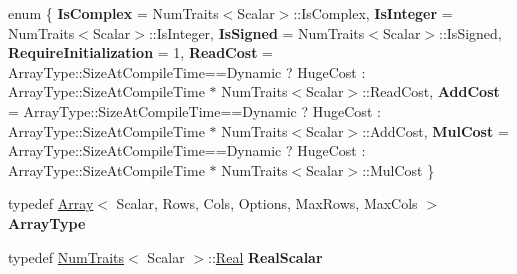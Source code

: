 \begin{DoxyCompactItemize}
\item 
\mbox{\label{struct_eigen_1_1_num_traits_3_01_array_3_01_scalar_00_01_rows_00_01_cols_00_01_options_00_01_max_rows_00_01_max_cols_01_4_01_4_aa0b8464e6397d3e48a977daf7680cbae}} 
enum \{ \newline
{\bfseries Is\+Complex} = Num\+Traits$<$Scalar$>$\+::Is\+Complex, 
{\bfseries Is\+Integer} = Num\+Traits$<$Scalar$>$\+::Is\+Integer, 
{\bfseries Is\+Signed} = Num\+Traits$<$Scalar$>$\+::Is\+Signed, 
{\bfseries Require\+Initialization} = 1, 
\newline
{\bfseries Read\+Cost} = Array\+Type\+::Size\+At\+Compile\+Time==Dynamic ? Huge\+Cost \+: Array\+Type\+::Size\+At\+Compile\+Time $\ast$ Num\+Traits$<$Scalar$>$\+::Read\+Cost, 
{\bfseries Add\+Cost} = Array\+Type\+::Size\+At\+Compile\+Time==Dynamic ? Huge\+Cost \+: Array\+Type\+::Size\+At\+Compile\+Time $\ast$ Num\+Traits$<$Scalar$>$\+::Add\+Cost, 
{\bfseries Mul\+Cost} = Array\+Type\+::Size\+At\+Compile\+Time==Dynamic ? Huge\+Cost \+: Array\+Type\+::Size\+At\+Compile\+Time $\ast$ Num\+Traits$<$Scalar$>$\+::Mul\+Cost
 \}
\item 
\mbox{\label{struct_eigen_1_1_num_traits_3_01_array_3_01_scalar_00_01_rows_00_01_cols_00_01_options_00_01_max_rows_00_01_max_cols_01_4_01_4_aa65515eccc2c3f0f88080835c975fbc2}} 
typedef \mbox{\hyperlink{class_eigen_1_1_array}{Array}}$<$ Scalar, Rows, Cols, Options, Max\+Rows, Max\+Cols $>$ {\bfseries Array\+Type}
\item 
\mbox{\label{struct_eigen_1_1_num_traits_3_01_array_3_01_scalar_00_01_rows_00_01_cols_00_01_options_00_01_max_rows_00_01_max_cols_01_4_01_4_a0466bb695bcb2ebd0692ad6ae99c37e5}} 
typedef \mbox{\hyperlink{struct_eigen_1_1_num_traits}{Num\+Traits}}$<$ Scalar $>$\+::\mbox{\hyperlink{class_eigen_1_1_array}{Real}} {\bfseries Real\+Scalar}
\item 
\mbox{\label{struct_eigen_1_1_num_traits_3_01_array_3_01_scalar_00_01_rows_00_01_cols_00_01_options_00_01_max_rows_00_01_max_cols_01_4_01_4_a4b36f130a9f51f5012d2630ca70431d7}} 

\end{DoxyCompactItemize}
